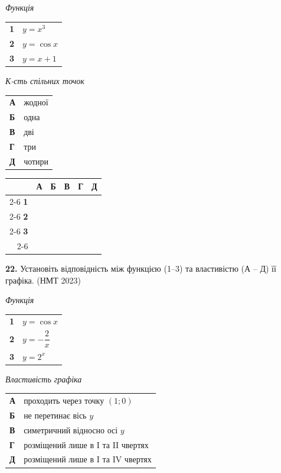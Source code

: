 \documentclass[14pt]{extarticle}
\newcommand{\answerGrid}{
    \begingroup
    \renewcommand{\arraystretch}{1.3} 
    \setlength{\tabcolsep}{7pt} 
    \begin{tabular}{r|c|c|c|c|c|}
         \multicolumn{1}{c}{} & \multicolumn{1}{c}{\textbf{А}} & \multicolumn{1}{c}{\textbf{Б}} & \multicolumn{1}{c}{\textbf{В}} & \multicolumn{1}{c}{\textbf{Г}} & \multicolumn{1}{c}{\textbf{Д}} \\ \cline{2-6}
         \textbf{1} & & & & & \\ \cline{2-6}
         \textbf{2} & & & & & \\ \cline{2-6}
         \textbf{3} & & & & & \\ \cline{2-6}
    \end{tabular}
    \endgroup
}
\newcommand{\matchingLayout}[3]{
    \noindent
    \begin{minipage}[t]{0.40\textwidth}
       
        #1
    \end{minipage}%
    \hfill
    \begin{minipage}[t]{0.28\textwidth}
        
        #2
    \end{minipage}%
    \hfill
    \begin{minipage}[t]{0.30\textwidth}
        \vspace{0pt} %
        \begin{flushright}
        #3
        \end{flushright}
    \end{minipage}
}
\newcommand{\nmtyear}[1]{\hfill{\small\color{yearcolor}(НМТ #1)}}
\begin{document}
\matchingLayout{
    \textit{Функція} \par \vspace{0.2cm}
    \begin{tabular}{@{}p{0.5cm} l@{}}
    \textbf{1} & $y=x^3$ \\[0.4cm]
    \textbf{2} & $y=\cos x$ \\[0.4cm]
    \textbf{3} & $y=x+1$ \\
    \end{tabular}
}{
    \textit{К-сть спільних точок} \par \vspace{0.2cm}
    \begin{tabular}{@{}p{0.5cm} l@{}}
    \textbf{А} & жодної \\[0.4cm]
    \textbf{Б} & одна \\[0.4cm]
    \textbf{В} & дві \\[0.4cm]
    \textbf{Г} & три \\[0.4cm]
    \textbf{Д} & чотири \\
    \end{tabular}
}{
    \answerGrid
}

\vspace{0.7cm}

\noindent\textbf{22.} Установіть відповідність між функцією (1–3) та властивістю (А – Д) її графіка. \nmtyear{2023}

\vspace{0.3cm}

\noindent
\begin{minipage}[t]{0.45\textwidth}
    \textit{Функція} \par \vspace{0.2cm}
    \begin{tabular}{@{}p{0.5cm} l@{}}
    \textbf{1} & $y=\cos x$ \\[0.4cm]
    \textbf{2} & $y=-\dfrac{2}{x}$ \\[0.6cm]
    \textbf{3} & $y=2^x$ \\
    \end{tabular}
\end{minipage}%
\hfill
\begin{minipage}[t]{0.50\textwidth}
    \textit{Властивість графіка} \par \vspace{0.2cm}
    \begin{tabular}{@{}p{0.5cm} p{7cm}@{}}
    \textbf{А} & проходить через точку $(1; 0)$ \\[0.2cm]
    \textbf{Б} & не перетинає вісь $y$ \\[0.2cm]
    \textbf{В} & симетричний відносно осі $y$ \\[0.2cm]
    \textbf{Г} & розміщений лише в I та II чвертях \\[0.2cm]
    \textbf{Д} & розміщений лише в I та IV чвертях \\
    \end{tabular}
\end{minipage}
\end{document}
